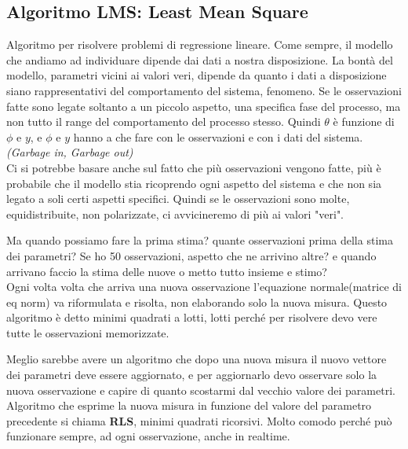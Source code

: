 \documentclass[10pt,a4paper]{article}
\begin{document}
\subsection{Algoritmo LMS: Least Mean Square}
Algoritmo per risolvere problemi di regressione lineare.
Come sempre, il modello che andiamo ad individuare dipende dai dati a nostra disposizione. La bontà del modello, parametri vicini ai valori veri, dipende da quanto i dati a disposizione siano rappresentativi del comportamento del sistema, fenomeno.
Se le osservazioni fatte sono legate soltanto a un piccolo aspetto, una specifica fase del processo, ma non tutto il range del comportamento del processo stesso. Quindi $ \theta $ è funzione di $\phi$ e $y$, e $\phi$ e $y$ hanno a che fare con le osservazioni e con i dati del sistema.\\
\textit{(Garbage in, Garbage out)}\\
Ci si potrebbe basare anche sul fatto che più osservazioni vengono fatte, più è probabile che il modello stia ricoprendo ogni aspetto del sistema e che non sia legato a soli certi aspetti specifici. Quindi se le osservazioni sono molte, equidistribuite, non polarizzate, ci avvicineremo di più ai valori "veri".

Ma quando possiamo fare la prima stima? quante osservazioni prima della stima dei parametri?
Se ho 50 osservazioni, aspetto che ne arrivino altre? e quando arrivano faccio la stima delle nuove o metto tutto insieme e stimo?\\

Ogni volta volta che arriva una nuova osservazione l'equazione normale(matrice di eq norm) va riformulata e risolta, non elaborando solo la nuova misura.
Questo algoritmo è detto minimi quadrati a lotti, lotti perché per risolvere devo vere tutte le osservazioni memorizzate.

Meglio sarebbe avere un algoritmo che dopo una nuova misura il nuovo vettore dei parametri deve essere aggiornato, e per aggiornarlo devo osservare solo la nuova osservazione e capire di quanto scostarmi dal vecchio valore dei parametri.\\

Algoritmo che esprime la nuova misura in funzione del valore del parametro precedente si chiama \textbf{RLS}, minimi quadrati ricorsivi.
Molto comodo perché può funzionare sempre, ad ogni osservazione, anche in realtime.
\end{document}
